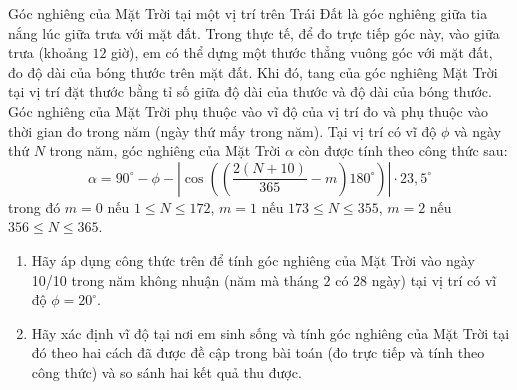 \begin{bt}%
Góc nghiêng của Mặt Trời tại một vị trí trên Trái Đất là góc nghiêng giữa tia nắng lúc giữa trưa với mặt đất. Trong thực tế, để đo trực tiếp góc này, vào giữa trưa (khoảng $12$ giờ), em có thể dựng một thước thẳng vuông góc với mặt đất, đo độ dài của bóng thước trên mặt đất. Khi đó, tang của góc nghiêng Mặt Trời tại vị trí đặt thước bằng tỉ số giữa độ dài của thước và độ dài của bóng thước. Góc nghiêng của Mặt Trời phụ thuộc vào vĩ độ của vị trí đo và phụ thuộc vào thời gian đo trong năm (ngày thứ mấy trong năm). Tại vị trí có vĩ độ $\phi$ và ngày thứ $N$ trong năm, góc nghiêng của Mặt Trời $\alpha$ còn được tính theo công thức sau:
$$
\alpha=90^\circ-\phi-\left|\cos \left(\left(\dfrac{2(N+10)}{365}-m\right) 180^\circ\right)\right| \cdot 23{,}5^\circ
$$
trong đó $m=0$ nếu $1 \leq N \leq 172$, $m=1$ nếu $173 \leq N \leq 355$, $m=2$ nếu $356 \leq N \leq 365$.
\begin{enumerate}
	\item Hãy áp dụng công thức trên để tính góc nghiêng của Mặt Trời vào ngày 10/10 trong năm không nhuận (năm mà tháng $2$ có $28$ ngày) tại vị trí có vĩ độ $\phi=20^\circ$.
	\item Hãy xác định vĩ độ tại nơi em sinh sống và tính góc nghiêng của Mặt Trời tại đó theo hai cách đã được đề cập trong bài toán (đo trực tiếp và tính theo công thức) và so sánh hai kết quả thu được.
\end{enumerate} 
\end{bt}

